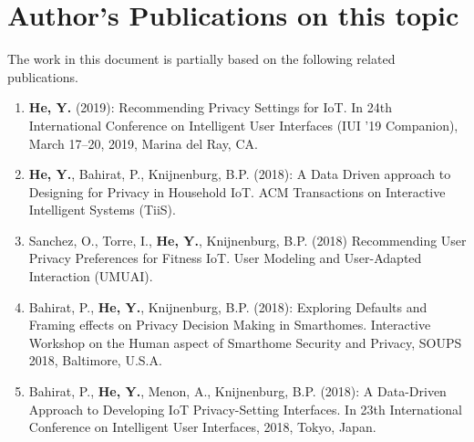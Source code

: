 \chapter{Author's Publications on this topic}
\noindent The work in this document is partially based on the following related publications.
\begin{enumerate}
	\item \textbf{He, Y.} (2019): Recommending Privacy Settings for IoT. In 24th International Conference on Intelligent User Interfaces (IUI ’19 Companion), March 17--20, 2019, Marina del Ray, CA.
	
	\item \textbf{He, Y.}, Bahirat, P., Knijnenburg, B.P. (2018): A Data Driven approach to Designing for Privacy in Household IoT. ACM Transactions on Interactive Intelligent Systems (TiiS).
	
	\item Sanchez, O., Torre, I.,\textbf{ He, Y.}, Knijnenburg, B.P. (2018) Recommending User Privacy Preferences for Fitness IoT. User Modeling and User-Adapted Interaction (UMUAI).
	
	\item Bahirat, P., \textbf{He, Y.}, Knijnenburg, B.P. (2018): Exploring Defaults and Framing effects on Privacy Decision Making in Smarthomes. Interactive Workshop on the Human aspect of Smarthome Security and Privacy, SOUPS 2018, Baltimore, U.S.A.
	\item Bahirat, P., \textbf{He, Y.}, Menon, A., Knijnenburg, B.P. (2018): A Data-Driven Approach to Developing IoT Privacy-Setting Interfaces. In 23th International Conference on Intelligent User Interfaces, 2018, Tokyo, Japan.
	
	
%	
\end{enumerate}